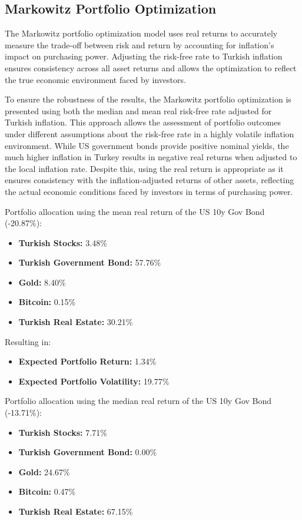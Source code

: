 \documentclass[
]{article}
\begin{document}
\subsection{Markowitz Portfolio Optimization}

The Markowitz portfolio optimization model uses real returns to accurately measure the trade-off between risk and return by accounting for inflation's impact on purchasing power. Adjusting the risk-free rate to Turkish inflation ensures consistency across all asset returns and allows the optimization to reflect the true economic environment faced by investors.

To ensure the robustness of the results, the Markowitz portfolio optimization is presented using both the median and mean real risk-free rate adjusted for Turkish inflation. This approach allows the assessment of portfolio outcomes under different assumptions about the risk-free rate in a highly volatile inflation environment. While US government bonds provide positive nominal yields, the much higher inflation in Turkey results in negative real returns when adjusted to the local inflation rate. Despite this, using the real return is appropriate as it ensures consistency with the inflation-adjusted returns of other assets, reflecting the actual economic conditions faced by investors in terms of purchasing power. 

Portfolio allocation using the mean real return of the US 10y Gov Bond (-20.87\%):

\begin{itemize}
  \item \textbf{Turkish Stocks:} 3.48\%
  \item \textbf{Turkish Government Bond:} 57.76\%
  \item \textbf{Gold:} 8.40\%
  \item \textbf{Bitcoin:} 0.15\%
  \item \textbf{Turkish Real Estate:} 30.21\%
\end{itemize}

Resulting in:
\begin{itemize}
  \item \textbf{Expected Portfolio Return:} 1.34\%
  \item \textbf{Expected Portfolio Volatility:} 19.77\%
\end{itemize}

Portfolio allocation using the median real return of the US 10y Gov Bond (-13.71\%):

\begin{itemize}
  \item \textbf{Turkish Stocks:} 7.71\%
  \item \textbf{Turkish Government Bond:} 0.00\%
  \item \textbf{Gold:} 24.67\%
  \item \textbf{Bitcoin:} 0.47\%
  \item \textbf{Turkish Real Estate:} 67.15\%
\end{itemize}
\end{document}
